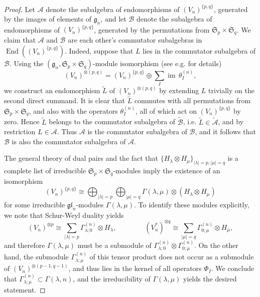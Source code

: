 \documentclass[12pt,reqno]{amsart}
\numberwithin{equation}{section}
\theoremstyle{plain}
\theoremstyle{definition}
\def\gl{\mathfrak{gl}}
\DeclareMathOperator{\End}{End} %
\def\im{\operatorname{im}}
\def\o{\otimes}
\def\g{\mathfrak g}
\def\({\left(}
\def\){\right)}
\begin{document}
\begin{proof}
Let $\mathcal A$ denote the subalgebra of endomorphisms of $(V_n)^{
\{p,q\} }$, generated by the images of elements of $\g_n$, and let
$\mathcal B$ denote the subalgebra of endomorphisms of $(V_n)^{
\{p,q\} }$, generated by the permutations from $\mathfrak S_p \times
\mathfrak S_q$. We claim that $\mathcal A$ and $\mathcal B$ are each
other's commutator subalgebras in $\End\( (V_n)^{ \{p,q\} } \)$.
Indeed, suppose that $L$ lies in the commutator subalgebra of
$\mathcal B$. Using the $(\g_n,\mathfrak S_p \times \mathfrak
S_q)$-module isomorphism (see e.g. \cite{FH} for details)
\begin{equation*}%
    (V_n)^{\o (p, q)} = (V_n)^{ \{p,q\} } \oplus
    \sum_{I} \im \, \theta_{I}^{(n)},
\end{equation*}
we construct an endomorphism $\widetilde L$ of $(V_n)^{\o (p, q)}$
by extending $L$ trivially on the second direct summand. It is clear
that $\widetilde L$ commutes with all permutations from $\mathfrak
S_p \times \mathfrak S_q$, and also with the operators $\theta_I^{(n)}$, all of which
act on $(V_n)^{ \{p,q\} }$ by zero. Hence $\widetilde L$ belongs to
the commutator subalgebra of $\widetilde{\mathcal B}$, i.e.
$\widetilde L \in \widetilde{\mathcal A}$, and by restriction $L \in
\mathcal A$. Thus $\mathcal A$ is the commutator subalgebra of
$\mathcal B$, and it follows that $\mathcal B$ is also the
commutator subalgebra of $\mathcal A$.

The general theory of dual pairs and the fact that $\{H_\lambda \o
H_\mu\}_{|\lambda|=p, |\mu|=q}$ is a complete list of irreducible
$\mathfrak S_p \times \mathfrak S_q$-modules imply the existence of an isomorphism
\begin{equation*}
    (V_n)^{\{p,q\}} \cong \bigoplus_{|\lambda|=p} \bigoplus_{|\mu| = q}
    \Gamma(\lambda,\mu) \o (H_\lambda \o H_\mu)
\end{equation*}
for some irreducible $\gl_n$-modules $\Gamma(\lambda,\mu)$. To identify these modules explicitly, we note that Schur-Weyl duality yields
\begin{equation*}
    (V_n)^{\o p} \cong \sum_{|\lambda|=p} \varGamma_{\lambda;0}^{(n)} \o H_\lambda,
    \qquad\qquad
    (V_n^*)^{\o q} \cong \sum_{|\mu|=q} \varGamma_{0;\mu}^{(n)} \o H_\mu,
\end{equation*}
and therefore $\Gamma(\lambda,\mu)$ must be a submodule of $\varGamma_{\lambda;0}^{(n)} \o \varGamma_{0;\mu}^{(n)}$. On the other hand, the submodule
$\varGamma_{\lambda;\mu}^{(n)}$ of this tensor product does not occur as a submodule of $(V_n)^{\o(p-1,q-1)}$,
and thus lies in the kernel of all operators $\Phi_I$. We conclude that $\varGamma_{\lambda;\mu}^{(n)} \subset \Gamma(\lambda,n)$, and the irreducibility of
$\Gamma(\lambda,\mu)$ yields the desired statement.
\end{proof}
\end{document}
